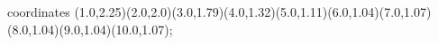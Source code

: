 					coordinates { (1.0,2.25)(2.0,2.0)(3.0,1.79)(4.0,1.32)(5.0,1.11)(6.0,1.04)(7.0,1.07)(8.0,1.04)(9.0,1.04)(10.0,1.07)};
